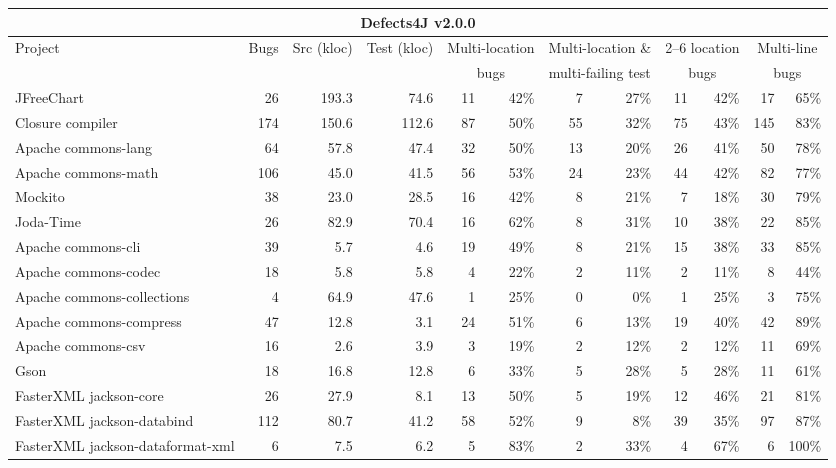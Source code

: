 \documentclass[10pt, conference]{IEEEtran}
\begin{document}
\begin{table}
\begin{center}
\begin{tabular}{l  rrr | rr | rr | rr | rr }
\toprule
\multicolumn{12}{c}{\textbf{Defects4J v2.0.0}} \\
\midrule
Project & Bugs & Src (kloc) & Test (kloc) & \multicolumn{2}{c}{Multi-location} & \multicolumn{2}{c}{Multi-location \&}      & \multicolumn{2}{c}{2--6 location} & \multicolumn{2}{c}{Multi-line} \\
            &          &                  &                  & \multicolumn{2}{c}{bugs}              & \multicolumn{2}{c}{multi-failing test}   & \multicolumn{2}{c}{bugs}             & \multicolumn{2}{c}{bugs} \\
\midrule
JFreeChart  & 26 & 193.3 & 74.6  & 11 & 42\% & 7 & 27\% & 11 & 42\% & 17 & 65\%\\
Closure compiler & 174 & 150.6 & 112.6 & 87 & 50\% & 55 & 32\% & 75 & 43\% & 145 & 83\% \\
Apache commons-lang & 64 & 57.8 & 47.4  & 32 & 50\% & 13 & 20\% & 26 & 41\% & 50 & 78\% \\
Apache commons-math & 106 & 45.0 & 41.5 & 56 & 53\% & 24 & 23\% & 44 & 42\% & 82 & 77\% \\
Mockito & 38 & 23.0 & 28.5 & 16 & 42\% & 8 & 21\% & 7 & 18\% & 30 & 79\% \\
Joda-Time & 26 & 82.9 & 70.4 & 16 & 62\% & 8 & 31\% & 10 & 38\% & 22 & 85\% \\
Apache commons-cli & 39 & 5.7 & 4.6 & 19 & 49\% & 8 & 21\% & 15 & 38\% & 33 & 85\% \\
Apache commons-codec & 18 & 5.8 & 5.8 & 4 & 22\% & 2 & 11\% & 2 & 11\% & 8 & 44\% \\
Apache commons-collections & 4 & 64.9 & 47.6 & 1 & 25\% & 0 & 0\% & 1 & 25\% & 3 & 75\% \\
Apache commons-compress & 47 & 12.8 & 3.1 & 24 & 51\% & 6 & 13\% & 19 & 40\% & 42 & 89\% \\ 
Apache commons-csv & 16 & 2.6 & 3.9 & 3 & 19\% & 2 & 12\% & 2 & 12\% & 11 & 69\% \\
Gson & 18 & 16.8 & 12.8 & 6 & 33\% & 5 & 28\% & 5 & 28\% & 11 & 61\% \\
FasterXML jackson-core & 26 & 27.9 & 8.1 & 13 & 50\% & 5 & 19\% & 12 & 46\% & 21 & 81\% \\
FasterXML jackson-databind & 112 & 80.7 & 41.2 & 58 & 52\% & 9 & 8\% & 39 & 35\% & 97 & 87\% \\
FasterXML jackson-dataformat-xml & 6 & 7.5 & 6.2 & 5 & 83\% & 2 & 33\% & 4 & 67\% & 6 & 100\% \\

\end{tabular}
\end{center}
\end{table}
\end{document}
